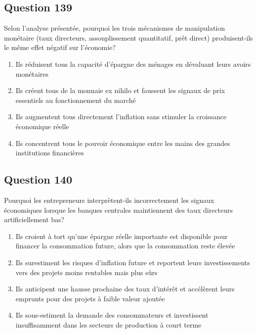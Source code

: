 \documentclass[12pt,a4paper]{article}
\begin{document}
\bigskip


\subsection*{Question 139}
Selon l'analyse présentée, pourquoi les trois mécanismes de manipulation monétaire (taux directeurs, assouplissement quantitatif, prêt direct) produisent-ils le même effet négatif sur l'économie?

\begin{enumerate}[label=\Alph*., leftmargin=*]
\item Ils réduisent tous la capacité d'épargne des ménages en dévaluant leurs avoirs monétaires
\item Ils créent tous de la monnaie ex nihilo et faussent les signaux de prix essentiels au fonctionnement du marché
\item Ils augmentent tous directement l'inflation sans stimuler la croissance économique réelle
\item Ils concentrent tous le pouvoir économique entre les mains des grandes institutions financières
\end{enumerate}

\bigskip


\subsection*{Question 140}
Pourquoi les entrepreneurs interprètent-ils incorrectement les signaux économiques lorsque les banques centrales maintiennent des taux directeurs artificiellement bas?

\begin{enumerate}[label=\Alph*., leftmargin=*]
\item Ils croient à tort qu'une épargne réelle importante est disponible pour financer la consommation future, alors que la consommation reste élevée
\item Ils surestiment les risques d'inflation future et reportent leurs investissements vers des projets moins rentables mais plus sûrs
\item Ils anticipent une hausse prochaine des taux d'intérêt et accélèrent leurs emprunts pour des projets à faible valeur ajoutée
\item Ils sous-estiment la demande des consommateurs et investissent insuffisamment dans les secteurs de production à court terme
\end{enumerate}

\bigskip
\end{document}
